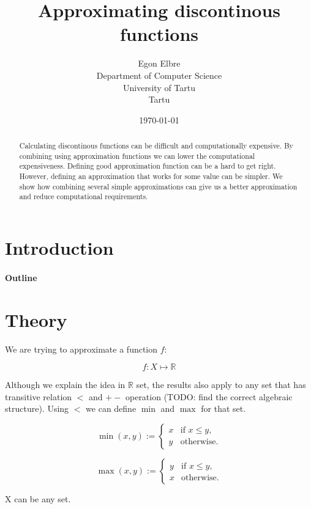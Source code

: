 \documentclass [12pt]{article} %
\title{Approximating discontinous functions}
\author{
    Egon Elbre \\
        Department of Computer Science \\
    University of Tartu\\
    Tartu\\
}
\date{\today}
\begin{document}
\maketitle

\begin{abstract}
Calculating discontinous functions can be difficult and computationally
expensive. By combining using approximation functions we can lower 
the computational expensiveness. Defining good approximation function 
can be a hard to get right. However, defining an approximation 
that works for some value can be simpler. We show how combining
several simple approximations can give us a better approximation
and reduce computational requirements.
\end{abstract}

\section{Introduction}

\paragraph{Outline}

\section{Theory}

\newcommand{\Real}{\mathbb{R}}
\newcommand{\defas}{ := }
\newcommand{\err}[1]{\varepsilon_{#1}}

We are trying to approximate a function $f$:

$$f : X \mapsto \Real$$

Although we explain the idea in $\Real$ set, the results also apply to 
any set that has transitive relation $<$ and $+-$ operation (TODO: find the correct algebraic structure). 
Using $<$ we can define $\min$ and $\max$ for that set.

$$ \min(x,y) \defas \begin{cases}
    x & \text{if $x \leq y$}, \\
    y & \text{otherwise}.
\end{cases}
$$

$$
\max(x,y) \defas \begin{cases}
    y & \text{if $x \leq y$}, \\
    x & \text{otherwise}.
\end{cases}
$$

X can be any set.
\end{document}
